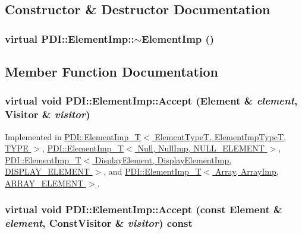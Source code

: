 \subsection{Constructor \& Destructor Documentation}
\hypertarget{class_p_d_i_1_1_element_imp_a746488e78669ae5a034ae62d67fae2b}{
\subsubsection[{$\sim$ElementImp}]{\setlength{\rightskip}{0pt plus 5cm}virtual PDI::ElementImp::$\sim$ElementImp ()}}
\label{class_p_d_i_1_1_element_imp_a746488e78669ae5a034ae62d67fae2b}




\subsection{Member Function Documentation}
\hypertarget{class_p_d_i_1_1_element_imp_7734c5f4b0ebd52ef8ee8c3faa4951d7}{
\subsubsection[{Accept}]{\setlength{\rightskip}{0pt plus 5cm}virtual void PDI::ElementImp::Accept ({\bf Element} \& {\em element}, \/  {\bf Visitor} \& {\em visitor})}}
\label{class_p_d_i_1_1_element_imp_7734c5f4b0ebd52ef8ee8c3faa4951d7}




Implemented in \hyperlink{class_p_d_i_1_1_element_imp___t_69151861ad5ad48355c81810f0d5b95b}{PDI::ElementImp\_\-T$<$ ElementTypeT, ElementImpTypeT, TYPE $>$}, \hyperlink{class_p_d_i_1_1_element_imp___t_69151861ad5ad48355c81810f0d5b95b}{PDI::ElementImp\_\-T$<$ Null, NullImp, NULL\_\-ELEMENT $>$}, \hyperlink{class_p_d_i_1_1_element_imp___t_69151861ad5ad48355c81810f0d5b95b}{PDI::ElementImp\_\-T$<$ DisplayElement, DisplayElementImp, DISPLAY\_\-ELEMENT $>$}, and \hyperlink{class_p_d_i_1_1_element_imp___t_69151861ad5ad48355c81810f0d5b95b}{PDI::ElementImp\_\-T$<$ Array, ArrayImp, ARRAY\_\-ELEMENT $>$}.\hypertarget{class_p_d_i_1_1_element_imp_441e3d2c989f21db8e01ae77616a9f77}{
\subsubsection[{Accept}]{\setlength{\rightskip}{0pt plus 5cm}virtual void PDI::ElementImp::Accept (const {\bf Element} \& {\em element}, \/  {\bf ConstVisitor} \& {\em visitor}) const}}
\label{class_p_d_i_1_1_element_imp_441e3d2c989f21db8e01ae77616a9f77}




